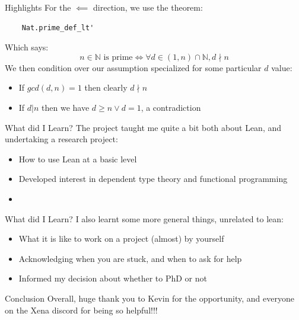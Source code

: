 \documentclass[presentation]{beamer}
\begin{document}
\begin{frame}[fragile]{Highlights}
    For the \(\impliedby\) direction, we use the theorem:
    \begin{verbatim}
    Nat.prime_def_lt'
    \end{verbatim}
    Which says:
    \[n \in \mathbb{N} \text{ is prime} \iff \forall d \in (1, n) \cap \mathbb{N}, d \nmid n\]
    \pause
    We then condition over our assumption specialized for some particular \(d\) value:
    \begin{itemize}
        \item If \(gcd(d, n) = 1\) then clearly \(d \nmid n\)
        \item If \(d \vert n\) then we have \(d \geq n \vee d = 1\), a contradiction
    \end{itemize}
    
\end{frame}


\begin{frame}{What did I Learn?}
    The project taught me quite a bit both about Lean, and undertaking a research project:
    \pause
    \begin{itemize}
        \item How to use Lean at a basic level
        \pause
        \item Developed interest in dependent type theory and functional programming
        \pause
        \item 
    \end{itemize}
\end{frame}

\begin{frame}{What did I Learn?}
    I also learnt some more general things, unrelated to lean:
    \pause
    \begin{itemize}
        \item What it is like to work on a project (almost) by yourself
        \pause
        \item Acknowledging when you are stuck, and when to ask for help 
        \pause
        \item Informed my decision about whether to PhD or not 
    \end{itemize}
\end{frame}


\begin{frame}{Conclusion}
    Overall, huge thank you to Kevin for the opportunity, and everyone on the Xena discord for being so helpful!!!
    
\end{frame}
\end{document}
